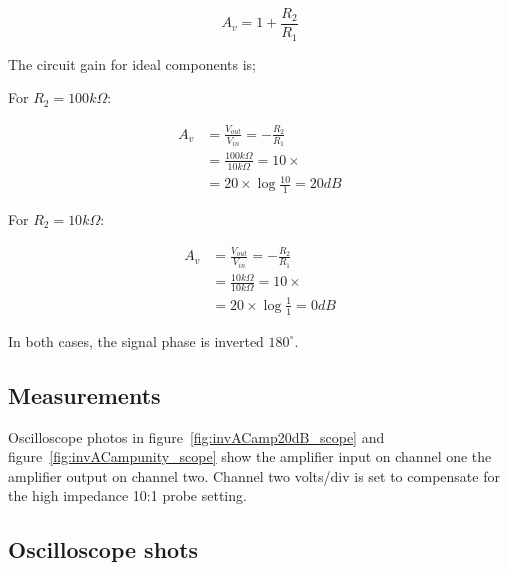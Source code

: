 \documentclass[]{article}
\begin{document}
\begin{equation}
    A_v = 1+\frac{R_2}{R_1}
\end{equation}

The circuit gain for ideal components is;

For $R_2 = 100k\Omega$:

\begin{align} 
A_v     &= \frac{V_{out}}{V_{in}} = -\frac{R_2}{R_1}\\
        &= \frac{100k\Omega}{10k\Omega} = 10\times\\
        &= 20 \times \log{\frac{10}{1}} = 20dB  
\end{align}

For $R_2 = 10k\Omega$:

\begin{align} 
A_v     &= \frac{V_{out}}{V_{in}} = -\frac{R_2}{R_1}\\
        &= \frac{10k\Omega}{10k\Omega} = 10\times\\
        &= 20 \times \log{\frac{1}{1}} = 0dB  
\end{align}

In both cases, the signal phase is inverted $180^\circ$.


\subsection{Measurements}\label{invAC-measurements-1}
Oscilloscope photos in figure~\ref{fig:invACamp20dB_scope} and figure~\ref{fig:invACampunity_scope} show the amplifier input on channel one
the amplifier output on channel two.
Channel two volts/div is set to compensate for the high impedance 10:1 probe setting. 

\subsection{Oscilloscope shots}\label{invAC-oscilloscope-shots}
\end{document}
